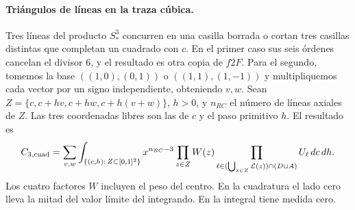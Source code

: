\paragraph{Triángulos de líneas en la traza cúbica.}
Tres líneas del producto \(S_*^3\) concurren en una casilla borrada o cortan tres casillas
distintas que completan un cuadrado con \(c\). En el primer caso sus seis órdenes cancelan
el divisor \(6\), y el resultado es otra copia de \(f2F\).
Para el segundo, tomemos la base \(((1,0),(0,1))\) o \(((1,1),(1,-1))\) y multipliquemos
cada vector por un signo independiente, obteniendo \(v,w\). Sean
\(Z=\{c,c+hv,c+hw,c+h(v+w)\}\), \(h>0\), y \(n_{RC}\) el número de líneas axiales de \(Z\).
Las tres coordenadas libres son las de \(c\) y el paso primitivo \(h\). El resultado es
\[
 C_{3,\rm cuad}=\sum_{v,w}\int_{\{(c,h):\,Z\subset[0,1]^2\}}
  x^{n_{RC}-3}\prod_{z\in Z}W(z)
  \prod_{\ell\in(\bigcup_{z\in Z}\mathcal L(z))\cap(D\cup A)}U_\ell\,dc\,dh .
\]
Los cuatro factores \(W\) incluyen el peso del centro. En la cuadratura el lado cero
lleva la mitad del valor límite del integrando. En la integral tiene medida cero.




